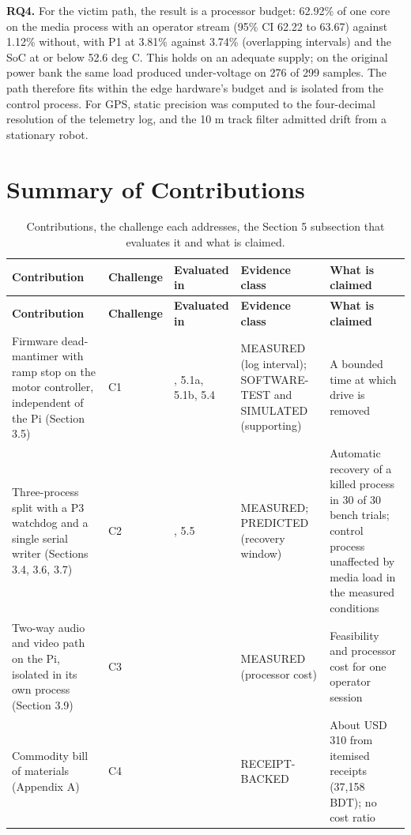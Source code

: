 \textbf{RQ4.} For the victim path, the result is a processor budget: 62.92\% of one core on the media process with an operator stream (95\% CI 62.22 to 63.67) against 1.12\% without, with P1 at 3.81\% against 3.74\% (overlapping intervals) and the SoC at or below 52.6 deg C. This holds on an adequate supply; on the original power bank the same load produced under-voltage on 276 of 299 samples. The path therefore fits within the edge hardware's budget and is isolated from the control process. For GPS, static precision was computed to the four-decimal resolution of the telemetry log, and the 10 m track filter admitted drift from a stationary robot.

\section{Summary of Contributions}

\begin{center}
\footnotesize
\setlength{\tabcolsep}{3pt}
\begin{longtable}{|>{\raggedright\arraybackslash}p{4.5cm}|>{\raggedright\arraybackslash}p{1.6cm}|>{\raggedright\arraybackslash}p{2cm}|>{\raggedright\arraybackslash}p{3cm}|>{\raggedright\arraybackslash}p{3.5cm}|}
\caption{Contributions, the challenge each addresses, the Section 5 subsection that evaluates it and what is claimed.\label{tab:contributions}} \\
\hline
\textbf{Contribution} & \textbf{Challenge} & \textbf{Evaluated in} & \textbf{Evidence class} & \textbf{What is claimed} \\
\hline
\endfirsthead
\textbf{Contribution} & \textbf{Challenge} & \textbf{Evaluated in} & \textbf{Evidence class} & \textbf{What is claimed} \\
\hline
\endhead
Firmware dead-mantimer with ramp stop on the motor controller, independent of the Pi (Section 3.5) & C1 & 5.1, 5.1a, 5.1b, 5.4 & MEASURED (log interval); SOFTWARE-TEST and SIMULATED (supporting) & A bounded time at which drive is removed \\
\hline
Three-process split with a P3 watchdog and a single serial writer (Sections 3.4, 3.6, 3.7) & C2 & 5.4, 5.5 & MEASURED; PREDICTED (recovery window) & Automatic recovery of a killed process in 30 of 30 bench trials; control process unaffected by media load in the measured conditions \\
\hline
Two-way audio and video path on the Pi, isolated in its own process (Section 3.9) & C3 & 5.5 & MEASURED (processor cost) & Feasibility and processor cost for one operator session \\
\hline
Commodity bill of materials (Appendix A) & C4 & 5.9 & RECEIPT-BACKED & About USD 310 from itemised receipts (37,158 BDT); no cost ratio \\
\hline
\end{longtable}
\end{center}
\vspace{-1.5\baselineskip}

